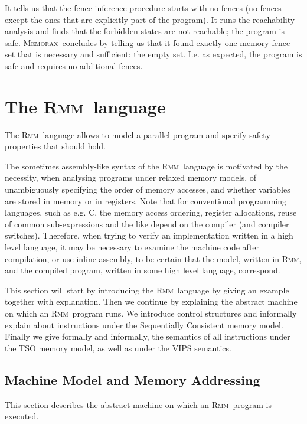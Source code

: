 \documentclass[a4paper]{article}
\newcommand{\memorax}{\textsc{Memorax}}
\newcommand{\rmm}{\textsc{Rmm}}
\begin{document}
It tells us that the fence inference procedure starts with no fences
(no fences except the ones that are explicitly part of the
program). It runs the reachability analysis and finds that the
forbidden states are not reachable; the program is safe. \memorax\
concludes by telling us that it found exactly one memory fence set
that is necessary and sufficient: the empty set. I.e. as expected, the
program is safe and requires no additional fences.

\section{The \rmm\ language}\label{sec:rmm:language}

The \rmm\ language allows to model a parallel program and specify safety
properties that should hold.

The sometimes assembly-like syntax of the \rmm\ language is motivated by
the necessity, when analysing programs under relaxed memory models, of
unambiguously specifying the order of memory accesses, and whether
variables are stored in memory or in registers. Note that for
conventional programming languages, such as e.g. C, the memory access
ordering, register allocations, reuse of common sub-expressions and the
like depend on the compiler (and compiler switches). Therefore, when
trying to verify an implementation written in a high level language,
it may be necessary to examine the machine code after compilation, or
use inline assembly, to be certain that the model, written in \rmm, and
the compiled program, written in some high level language, correspond.

This section will start by introducing the \rmm\ language by giving an
example together with explanation. Then we continue by explaining the
abstract machine on which an \rmm\ program runs. We introduce control
structures and informally explain about instructions under the
Sequentially Consistent memory model. Finally we give formally and
informally, the semantics of all instructions under the TSO memory
model, as well as under the VIPS semantics.

\subsection{Machine Model and Memory Addressing}\label{sec:abstmachinememaddr}

This section describes the abstract machine on which an \rmm\ program is
executed.
\end{document}

